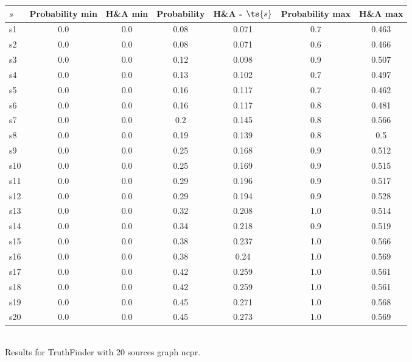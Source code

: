 \documentclass{article}
\begin{document}
\noindent\begin{tabular}{|l|c|c|c|c|c|c|}
\hline
$s$& Probability min & H\&A min & Probability & H\&A - $\ts{s}$ & Probability max & H\&A max\\
\hline
s1 &0.0 & 0.0 & 0.08 & 0.071 & 0.7 & 0.463\\
\hline
s2 &0.0 & 0.0 & 0.08 & 0.071 & 0.6 & 0.466\\
\hline
s3 &0.0 & 0.0 & 0.12 & 0.098 & 0.9 & 0.507\\
\hline
s4 &0.0 & 0.0 & 0.13 & 0.102 & 0.7 & 0.497\\
\hline
s5 &0.0 & 0.0 & 0.16 & 0.117 & 0.7 & 0.462\\
\hline
s6 &0.0 & 0.0 & 0.16 & 0.117 & 0.8 & 0.481\\
\hline
s7 &0.0 & 0.0 & 0.2 & 0.145 & 0.8 & 0.566\\
\hline
s8 &0.0 & 0.0 & 0.19 & 0.139 & 0.8 & 0.5\\
\hline
s9 &0.0 & 0.0 & 0.25 & 0.168 & 0.9 & 0.512\\
\hline
s10 &0.0 & 0.0 & 0.25 & 0.169 & 0.9 & 0.515\\
\hline
s11 &0.0 & 0.0 & 0.29 & 0.196 & 0.9 & 0.517\\
\hline
s12 &0.0 & 0.0 & 0.29 & 0.194 & 0.9 & 0.528\\
\hline
s13 &0.0 & 0.0 & 0.32 & 0.208 & 1.0 & 0.514\\
\hline
s14 &0.0 & 0.0 & 0.34 & 0.218 & 0.9 & 0.519\\
\hline
s15 &0.0 & 0.0 & 0.38 & 0.237 & 1.0 & 0.566\\
\hline
s16 &0.0 & 0.0 & 0.38 & 0.24 & 1.0 & 0.569\\
\hline
s17 &0.0 & 0.0 & 0.42 & 0.259 & 1.0 & 0.561\\
\hline
s18 &0.0 & 0.0 & 0.42 & 0.259 & 1.0 & 0.561\\
\hline
s19 &0.0 & 0.0 & 0.45 & 0.271 & 1.0 & 0.568\\
\hline
s20 &0.0 & 0.0 & 0.45 & 0.273 & 1.0 & 0.569\\
\hline
\end{tabular}\\

\noindent Results for TruthFinder with 20 sources graph ncpr.
\end{document}

